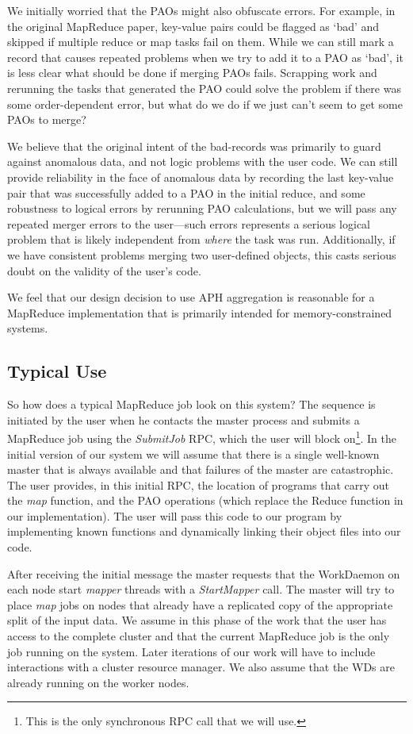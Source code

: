 \documentclass[10pt,letter,final,article,twocolumn]{article} %
\newcommand{\rpc}[1]{\emph{#1}}
\begin{document}
We initially worried that the PAOs might also obfuscate errors. For example, in the original MapReduce paper, key-value pairs could be flagged as `bad' and skipped if multiple reduce or map tasks fail on them. While we can still mark a record that causes repeated problems when we try to add it to a PAO as `bad', it is less clear what should be done if merging PAOs fails. Scrapping work and rerunning the tasks that generated the PAO could solve the problem if there was some order-dependent error, but what do we do if we just can't seem to get some PAOs to merge?

We believe that  the original intent of the bad-records was primarily to guard against anomalous data, and not logic problems with the user code. We can still provide reliability in the face of anomalous data by recording the last key-value pair that was successfully added to a PAO in the initial reduce, and some robustness to logical errors by rerunning PAO calculations, but we will  pass any repeated merger errors to the user---such errors represents a serious logical problem that is likely independent from \emph{where} the task was run. Additionally, if we have consistent problems merging two user-defined objects, this casts serious doubt on the validity of the user's code.

We feel that our design decision to use APH aggregation is reasonable for a MapReduce implementation that is primarily intended for memory-constrained systems.

\subsection{Typical Use}

So how does a typical MapReduce job look on this system? The sequence is initiated by the user when he contacts the master process and submits a MapReduce job using the \rpc{SubmitJob} RPC, which the user will block on\footnote{This is the only synchronous RPC call that we will use.}. In the initial version of our system we will assume that there is a single well-known master that is always available and that failures of the master are catastrophic. The user provides, in this initial RPC, the location of programs that carry out the \emph{map} function, and the PAO operations (which replace the Reduce function in our implementation). The user will pass this code to our program by implementing known functions and dynamically linking their object files into our code.

After receiving the initial message the master requests that the WorkDaemon on each node start \emph{mapper} threads with a \rpc{StartMapper} call. The master will try to place \emph{map} jobs on nodes that already have a replicated copy of the appropriate split of the input data.  We assume in this phase of the work that the user has access to the complete cluster and that the current MapReduce job is the only job running on the system. Later iterations of our work will have to include interactions with a cluster resource manager. We also assume that the WDs are already running on the worker nodes.
\end{document}
